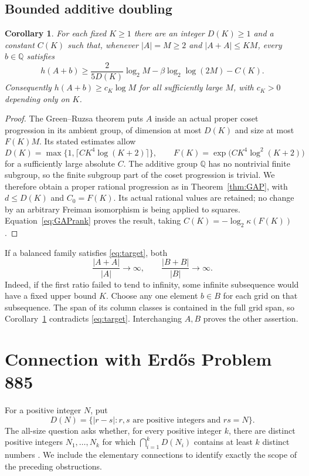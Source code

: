 \documentclass[11pt,letterpaper]{article}
\newtheorem{corollary}[theorem]{Corollary}
\theoremstyle{remark}\newtheorem{remark}[theorem]{Remark}
\newcommand{\Q}{\mathbb Q}
\begin{document}
\subsection{Bounded additive doubling}
\begin{corollary}\label{cor:doubling}
For each fixed $K\ge1$ there are an integer $D(K)\ge1$ and a constant $C(K)$ such that, whenever $|A|=M\ge2$ and $|A+A|\le K M$, every $b\in\Q$ satisfies
\begin{equation}\label{eq:doubling}
 h(A+b)\ge\frac{2}{5D(K)}\log_2M
      -\beta\log_2\log(2M)-C(K).
\end{equation}
Consequently $h(A+b)\ge c_K\log M$ for all sufficiently large $M$, with $c_K>0$ depending only on $K$.
\end{corollary}
\begin{proof}
The Green--Ruzsa theorem \cite[Theorem 1.1]{GR} puts $A$ inside an actual proper coset progression in its ambient group, of dimension at most $D(K)$ and size at most $F(K)M$. Its stated estimates allow
\[
 D(K)=\max\{1,\lceil C K^4\log(K+2)\rceil\},\qquad
 F(K)=\exp\bigl(C K^4\log^2(K+2)\bigr)
\]
for a sufficiently large absolute $C$. The additive group $\Q$ has no nontrivial finite subgroup, so the finite subgroup part of the coset progression is trivial. We therefore obtain a proper rational progression as in Theorem~\ref{thm:GAP}, with $d\le D(K)$ and $C_0=F(K)$. Its actual rational values are retained; no change by an arbitrary Freiman isomorphism is being applied to squares. Equation~\eqref{eq:GAPrank} proves the result, taking $C(K)=-\log_2\kappa(F(K))$.
\end{proof}

If a balanced family satisfies \eqref{eq:target}, both
\begin{equation}\label{eq:diverge}
 \frac{|A+A|}{|A|}\longrightarrow\infty,
 \qquad \frac{|B+B|}{|B|}\longrightarrow\infty.
\end{equation}
Indeed, if the first ratio failed to tend to infinity, some infinite subsequence would have a fixed upper bound $K$. Choose any one element $b\in B$ for each grid on that subsequence. The span of its column classes is contained in the full grid span, so Corollary~\ref{cor:doubling} contradicts \eqref{eq:target}. Interchanging $A,B$ proves the other assertion.

\section{Connection with Erd\H{o}s Problem 885}\label{sec:context}
For a positive integer $N$, put
\[
 D(N)=\{|r-s|:r,s\text{ are positive integers and }rs=N\}.
\]
The all-size question asks whether, for every positive integer $k$, there are distinct positive integers $N_1,\ldots,N_k$ for which $\bigcap_{i=1}^kD(N_i)$ contains at least $k$ distinct numbers \cite{E885}. We include the elementary connections to identify exactly the scope of the preceding obstructions.
\end{document}
